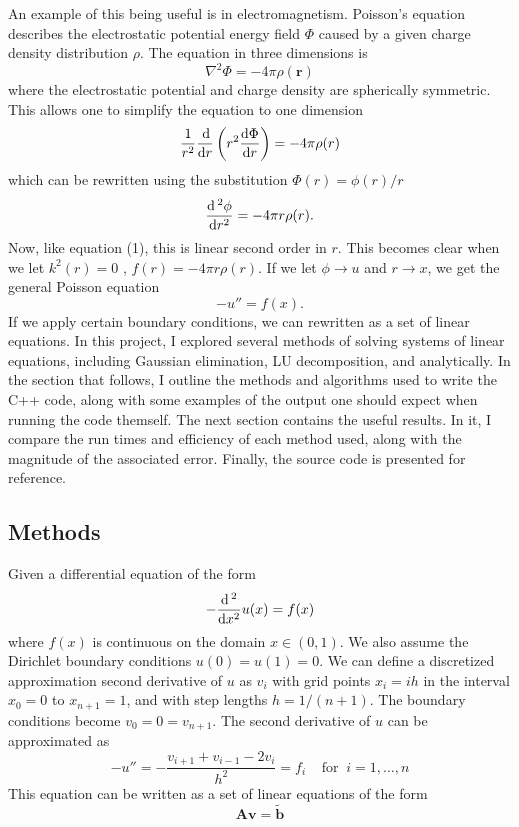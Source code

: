 \documentclass[11pt]{article}
\begin{document}
    An example of this being useful is in electromagnetism. Poisson's equation describes the electrostatic potential energy field $\Phi$ caused by a given charge density distribution $\rho$. The equation in three dimensions is
    \begin{equation} \nabla^2 \Phi = - 4 \pi \rho(\mathbf{r}) \end{equation}
    where the electrostatic potential and charge density are spherically symmetric. This allows one to simplify the equation to one dimension 
    \begin{equation} \dfrac{1}{r^2} \dfrac{\dif}{\dif r} \left( r^2 \dfrac{\dif \Phi}{\dif r} \right) = -4\pi \rho(r) \end{equation}
    which can be rewritten using the substitution $\Phi (r) = \phi (r) /r$
    \begin{equation} \dfrac{\dif\,^2 \phi}{\dif{r^2}} = -4\pi r \rho(r). \end{equation}
    Now, like equation (1), this is linear second order in $r$. This becomes clear when we let $k^2(r)=0$ , $f(r)=-4\pi r \rho(r)$. If we let $\phi \to u$ and $r \to x$, we get the general Poisson equation
    \begin{equation} -u'' = f(x). \end{equation}
    If we apply certain boundary conditions, we can rewritten as a set of linear equations. In this project, I explored several methods of solving systems of linear equations, including Gaussian elimination, LU decomposition, and analytically. In the section that follows, I outline the methods and algorithms used to write the C++ code, along with some examples of the output one should expect when running the code themself. The next section contains the useful results. In it, I compare the run times and efficiency of each method used, along with the magnitude of the associated error. Finally, the source code is presented for reference.

\subsection{Methods}

    Given a differential equation of the form 
    \begin{equation} - \dfrac{\dif\,^2}{\dif x^2} u(x) = f(x) \end{equation}
    where $f(x)$ is continuous on the domain $x \in (0,1)$. We also assume the Dirichlet boundary conditions $u(0)=u(1)=0$. We can define a discretized approximation second derivative of $u$ as $v_i$ with grid points $x_i=ih$ in the interval $x_0=0$ to $x_{n+1}=1$, and with step lengths $h=1/(n+1)$. The boundary conditions become $v_0 = 0 = v_{n+1}$. The second derivative of $u$ can be approximated as 
    \begin{equation} -u'' = -\dfrac{v_{i+1}+v_{i-1}-2v_i}{h^2} = f_i \;\;\;\; \text{for}\;\; i = 1,\dots,n \end{equation}
    This equation can be written as a set of linear equations of the form
    \begin{equation} \mathbf{Av} = \tilde{\mathbf{b}}  \end{equation}
    
\end{document}
